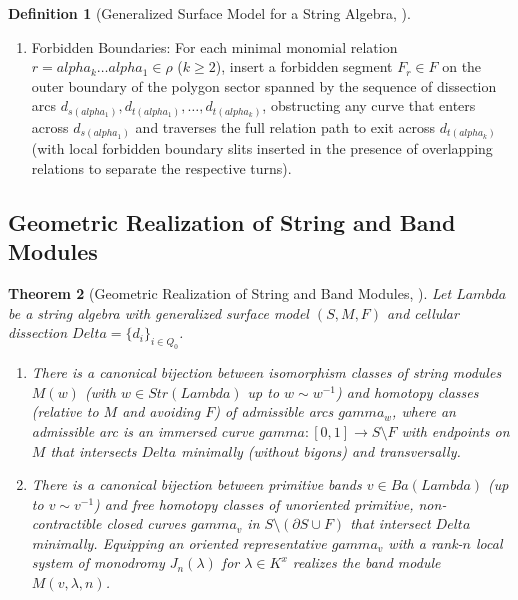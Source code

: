 \documentclass[11pt,a4paper,reqno]{amsart}
\def\mathcal#1{#1}%
\def\mathbb#1{#1}%
\def\operatorname#1{#1}%
\def\K{K}%
\def\forb{F}%
\def\times{x}%
\def\gamma{gamma}%
\def\alpha{alpha}%
\def\Delta{Delta}%
\def\Lambda{Lambda}%
\def\emph#1{#1}%
\def\textbf#1{#1}%
\newtheorem{theorem}{Theorem}[section]
\theoremstyle{definition}
\newtheorem{definition}[theorem]{Definition}
\theoremstyle{remark}
\newcommand{\K}{\mathbb{K}}
\newcommand{\forb}{\mathfrak{F}}
\begin{document}
\begin{definition}[Generalized Surface Model for a String Algebra, \cite{OPS2018, BCS2020, Brustle2020}]
\begin{enumerate}
    \item \textbf{Forbidden Boundaries:} For each minimal monomial relation $r = \alpha_k \dots \alpha_1 \in \rho$ ($k \ge 2$), insert a forbidden segment $F_r \in \forb$ on the outer boundary of the polygon sector spanned by the sequence of dissection arcs $d_{s(\alpha_1)}, d_{t(\alpha_1)}, \dots, d_{t(\alpha_k)}$, obstructing any curve that enters across $d_{s(\alpha_1)}$ and traverses the full relation path to exit across $d_{t(\alpha_k)}$ (with local forbidden boundary slits inserted in the presence of overlapping relations to separate the respective turns).
\end{enumerate}
\end{definition}

\subsection{Geometric Realization of String and Band Modules}
\label{subsec:geometric_realization}

\begin{theorem}[Geometric Realization of String and Band Modules, \cite{OPS2018, BCS2020, Brustle2020}]
\label{thm:bls_realization}
Let $\Lambda$ be a string algebra with generalized surface model $(\mathcal{S}, \mathcal{M}, \forb)$ and cellular dissection $\Delta = \{d_i\}_{i \in Q_0}$.
\begin{enumerate}
    \item There is a canonical bijection between isomorphism classes of string modules $M(w)$ (with $w \in \operatorname{Str}(\Lambda)$ up to $w \sim w^{-1}$) and homotopy classes (relative to $\mathcal{M}$ and avoiding $\forb$) of \emph{admissible arcs} $\gamma_w$, where an admissible arc is an immersed curve $\gamma \colon [0,1] \to \mathcal{S} \setminus \forb$ with endpoints on $\mathcal{M}$ that intersects $\Delta$ minimally (without bigons) and transversally.
    \item There is a canonical bijection between primitive bands $v \in \operatorname{Ba}(\Lambda)$ (up to $v \sim v^{-1}$) and free homotopy classes of unoriented primitive, non-contractible closed curves $\gamma_v$ in $\mathcal{S} \setminus (\partial\mathcal{S} \cup \forb)$ that intersect $\Delta$ minimally. Equipping an oriented representative $\gamma_v$ with a rank-$n$ local system of monodromy $J_n(\lambda)$ for $\lambda \in \K^\times$ realizes the band module $M(v, \lambda, n)$.
\end{enumerate}
\end{theorem}
\end{document}
